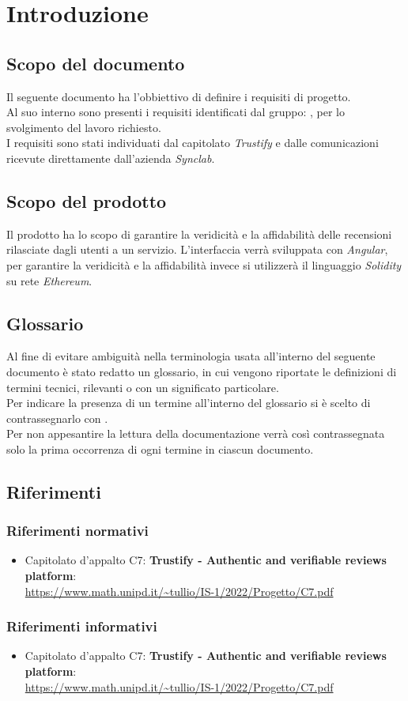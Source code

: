 \section{Introduzione}


\subsection{Scopo del documento}
Il seguente documento ha l'obbiettivo di definire i requisiti di progetto. \\ Al suo interno sono presenti i requisiti 
identificati dal gruppo: \groupName, per lo svolgimento del lavoro richiesto. \\ I requisiti sono stati individuati dal capitolato \textit{Trustify}
e dalle comunicazioni ricevute direttamente dall'azienda \textit{Synclab}.

\subsection{Scopo del prodotto}
Il prodotto ha lo scopo di garantire la veridicità e la affidabilità 
delle recensioni rilasciate dagli utenti a un servizio. L'interfaccia verrà
sviluppata con \textit{Angular}, per garantire la veridicità e la affidabilità 
invece si utilizzerà il linguaggio \textit{Solidity} su rete \textit{Ethereum}.


\subsection{Glossario}
Al fine di evitare ambiguità nella terminologia usata all'interno del seguente
documento è stato redatto un glossario, in cui vengono riportate le definizioni
di termini tecnici, rilevanti o con un significato particolare. \\ Per indicare
la presenza di un termine all'interno del glossario si è scelto di
contrassegnarlo con \glo.\\ Per non appesantire la lettura della documentazione
verrà così contrassegnata solo la prima occorrenza di ogni termine in ciascun
documento.

\subsection{Riferimenti}
    \subsubsection{Riferimenti normativi}
        \begin{itemize}
            \item Capitolato d'appalto C7: \textbf{Trustify - Authentic and verifiable reviews platform}: \\
            \url{https://www.math.unipd.it/~tullio/IS-1/2022/Progetto/C7.pdf}
        \end{itemize}
    \subsubsection{Riferimenti informativi}
    \begin{itemize}
        \item Capitolato d'appalto C7: \textbf{Trustify - Authentic and verifiable reviews platform}: \\
        \url{https://www.math.unipd.it/~tullio/IS-1/2022/Progetto/C7.pdf}
    \end{itemize}